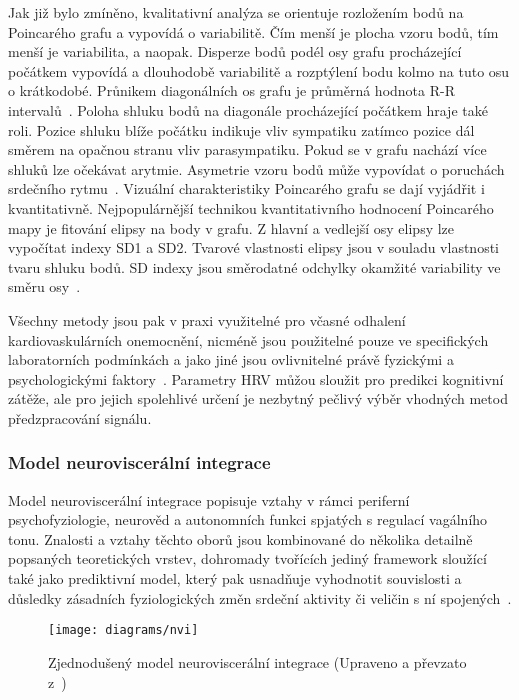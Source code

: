 Jak již bylo zmíněno, kvalitativní analýza se orientuje rozložením bodů na
Poincarého grafu a vypovídá o variabilitě. Čím menší je plocha vzoru bodů, tím
menší je variabilita, a naopak. Disperze bodů podél osy grafu procházející
počátkem vypovídá a dlouhodobě variabilitě a rozptýlení bodu kolmo na tuto osu o
krátkodobé. Průnikem diagonálních os grafu je průměrná hodnota R-R
intervalů~\cite{Hejjel2001}. Poloha shluku bodů na diagonále procházející
počátkem hraje také roli. Pozice shluku blíže počátku indikuje vliv sympatiku
zatímco pozice dál směrem na opačnou stranu vliv parasympatiku. Pokud se v grafu
nachází více shluků lze očekávat arytmie. Asymetrie vzoru bodů může vypovídat o
poruchách srdečního rytmu~\cite{Habib2013}. Vizuální charakteristiky Poincarého
grafu se dají vyjádřit i kvantitativně. Nejpopulárnější technikou
kvantitativního hodnocení Poincarého mapy je fitování elipsy na 
body v grafu. Z hlavní a vedlejší osy elipsy lze vypočítat indexy SD1 a SD2. Tvarové
vlastnosti elipsy jsou v souladu vlastnosti tvaru shluku bodů.
SD indexy jsou směrodatné odchylky okamžité variability ve směru
osy~\cite{Habib2013,Mazhar2007}.

Všechny metody jsou pak v praxi využitelné pro včasné odhalení
kardiovaskulárních onemocnění, nicméně jsou použitelné pouze ve specifických
laboratorních podmínkách a jako jiné jsou ovlivnitelné právě fyzickými a
psychologickými faktory~\cite{Habib2013,Kubickova2016}. Parametry HRV můžou
sloužit pro predikci kognitivní zátěže, ale pro jejich spolehlivé určení je
nezbytný pečlivý výběr vhodných metod předzpracování signálu.

\subsubsection{Model neuroviscerální integrace}
Model neuroviscerální integrace popisuje vztahy v rámci periferní
psychofyziologie, neurověd a autonomních funkci spjatých s regulací vagálního
tonu. Znalosti a vztahy těchto oborů jsou kombinované do několika detailně popsaných
teoretických vrstev, dohromady tvořících jediný framework sloužící také jako
prediktivní model, který pak usnadňuje vyhodnotit souvislosti a důsledky
zásadních fyziologických změn srdeční aktivity či veličin s ní
spojených~\cite{Smith2017}.

\begin{figure}[H]
	\begin{center}
		\texttt{[image: diagrams/nvi]}
		\caption{Zjednodušený model neuroviscerální integrace (Upraveno a převzato z~\cite{NVI20017})}
		\label{fig:nvi_model}
	\end{center}
\end{figure}

